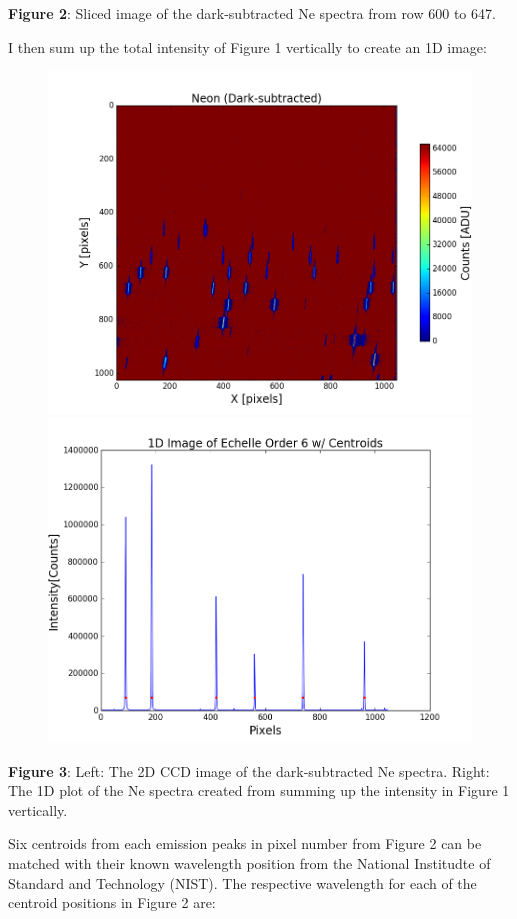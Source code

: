 \documentclass[onecolumn, 12pt, a4paper]{article}
\begin{document}
\textbf{Figure 2}: Sliced image of the dark-subtracted Ne spectra from row 600 to 647.\newline 

\begin{flushleft}
I then sum up the total intensity of Figure 1 vertically to create an 1D image:
\end{flushleft}
\begin{subfigure}{\linewidth}\hspace*{-.8cm}
  \includegraphics[width=.55\linewidth]{figure_1.png}
  \includegraphics[width=.55\linewidth]{figure_1-1.png}
\end{subfigure}\par\medskip

\textbf{Figure 3}: Left: The 2D CCD image of the dark-subtracted Ne spectra. Right: The 1D plot of the Ne spectra created from summing up the intensity in Figure 1 vertically. \newline

\begin{flushleft}
Six centroids from each emission peaks in pixel number from Figure 2 can be matched with their known wavelength position from the National Institudte of Standard and Technology (NIST). The respective wavelength for each of the centroid positions in Figure 2 are:
\end{flushleft}
\newline 
\end{document}

